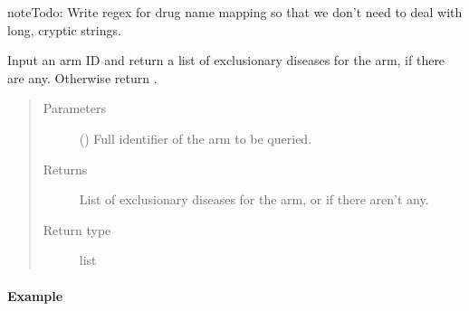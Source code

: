 \documentclass[letterpaper,10pt,english]{sphinxmanual}
\begin{document}
\begin{fulllineitems}
\begin{fulllineitems}
\begin{sphinxadmonition}{note}{\label{matchbox_api_utils:index-4}Todo:}
Write regex for drug name mapping so that we don’t need to deal with
long, cryptic strings.
\end{sphinxadmonition}

\end{fulllineitems}


\begin{fulllineitems}
\label{\detokenize{matchbox_api_utils:matchbox_api_utils.match_arms.TreatmentArms.get_exclusion_disease}}
Input an arm ID and return a list of exclusionary diseases for the arm,
if there are any. Otherwise return .
\begin{quote}\begin{description}
\item[{Parameters}] \leavevmode
{} () \textendash{} Full identifier of the arm to be queried.

\item[{Returns}] \leavevmode
List of exclusionary diseases for the arm, or  if there
aren’t any.

\item[{Return type}] \leavevmode
list

\end{description}\end{quote}
\paragraph{Example}

%
\begin{sphinxVerbatim}[commandchars=\\\{\}]
\end{sphinxVerbatim}

%
\begin{sphinxVerbatim}[commandchars=\\\{\}]
\end{sphinxVerbatim}


\end{fulllineitems}
\end{fulllineitems}
\end{document}
